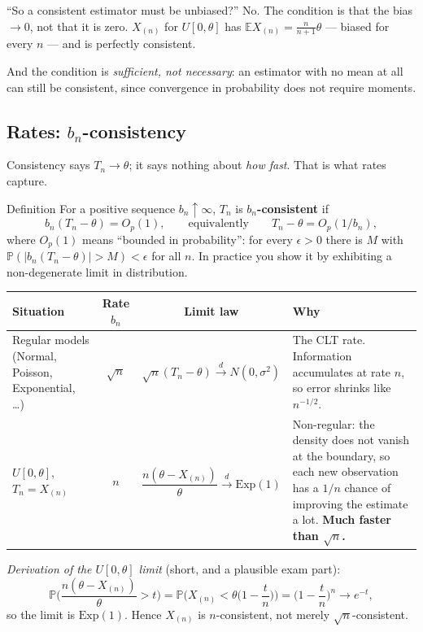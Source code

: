 \documentclass[11pt]{article}
\newcommand{\E}{\mathbb{E}}
\newcommand{\Prob}{\mathbb{P}}
\newcommand{\dto}{\overset{d}{\longrightarrow}}
\begin{document}
\begin{confusion}{``So a consistent estimator must be unbiased?''}
No. The condition is that the bias $\to0$, not that it is zero. $X_{(n)}$ for $U[0,\theta]$
has $\E X_{(n)}=\frac{n}{n+1}\theta$ --- biased for every $n$ --- and is perfectly consistent.

And the condition is \emph{sufficient, not necessary}: an estimator with no mean at all can
still be consistent, since convergence in probability does not require moments.
\end{confusion}

\subsection{Rates: $b_n$-consistency}

Consistency says $T_n\to\theta$; it says nothing about \emph{how fast}. That is what rates
capture.

\begin{idea}{Definition}
For a positive sequence $b_n\uparrow\infty$, $T_n$ is \textbf{$b_n$-consistent} if
\[
b_n(T_n-\theta)=O_p(1),\qquad\text{equivalently}\qquad T_n-\theta=O_p(1/b_n),
\]
where $O_p(1)$ means ``bounded in probability'': for every $\epsilon>0$ there is $M$ with
$\Prob(|b_n(T_n-\theta)|>M)<\epsilon$ for all $n$. In practice you show it by exhibiting a
non-degenerate limit in distribution.
\end{idea}

\begin{center}
\renewcommand{\arraystretch}{1.4}
\begin{tabular}{@{}lccp{6.4cm}@{}}
\toprule
Situation & Rate $b_n$ & Limit law & Why \\
\midrule
Regular models (Normal, Poisson, Exponential, \dots) & $\sqrt n$ &
$\sqrt n(T_n-\theta)\dto N(0,\sigma^2)$ & The CLT rate. Information accumulates at rate $n$,
so error shrinks like $n^{-1/2}$. \\
$U[0,\theta]$, $T_n=X_{(n)}$ & $n$ & $\dfrac{n(\theta-X_{(n)})}{\theta}\dto\mathrm{Exp}(1)$ &
Non-regular: the density does not vanish at the boundary, so each new observation has a
$1/n$ chance of improving the estimate a lot. \textbf{Much faster than $\sqrt n$.} \\
\bottomrule
\end{tabular}
\end{center}

\emph{Derivation of the $U[0,\theta]$ limit} (short, and a plausible exam part):
\[
\Prob\Big(\frac{n(\theta-X_{(n)})}{\theta}>t\Big)
=\Prob\Big(X_{(n)}<\theta\Big(1-\frac tn\Big)\Big)
=\Big(1-\frac tn\Big)^{n}\longrightarrow e^{-t},
\]
so the limit is $\mathrm{Exp}(1)$. Hence $X_{(n)}$ is $n$-consistent, not merely
$\sqrt n$-consistent.
\end{document}
